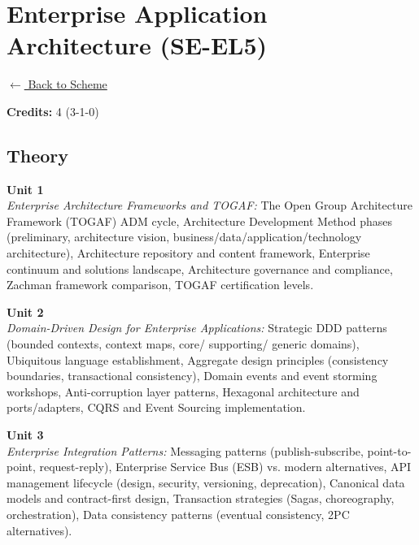 \section*{Enterprise Application Architecture (SE-EL5)}
\label{elec:SE_5}

\noindent \small{\hyperref[main:scheme]{$\leftarrow$ Back to Scheme}} \vspace{0.5cm}

\noindent \textbf{Credits:} 4 (3-1-0)

\subsection*{Theory}
\noindent\textbf{Unit 1} \\
\textit{Enterprise Architecture Frameworks and TOGAF:} The Open Group Architecture Framework (TOGAF) ADM cycle, Architecture Development Method phases (preliminary, architecture vision, business/data/application/technology architecture), Architecture repository and content framework, Enterprise continuum and solutions landscape, Architecture governance and compliance, Zachman framework comparison, TOGAF certification levels.

\vspace{0.3cm}

\noindent\textbf{Unit 2} \\
\textit{Domain-Driven Design for Enterprise Applications:} Strategic DDD patterns (bounded contexts, context maps, core/ supporting/ generic domains), Ubiquitous language establishment, Aggregate design principles (consistency boundaries, transactional consistency), Domain events and event storming workshops, Anti-corruption layer patterns, Hexagonal architecture and ports/adapters, CQRS and Event Sourcing implementation.

\vspace{0.3cm}

\noindent\textbf{Unit 3} \\
\textit{Enterprise Integration Patterns:} Messaging patterns (publish-subscribe, point-to-point, request-reply), Enterprise Service Bus (ESB) vs. modern alternatives, API management lifecycle (design, security, versioning, deprecation), Canonical data models and contract-first design, Transaction strategies (Sagas, choreography, orchestration), Data consistency patterns (eventual consistency, 2PC alternatives).

\vspace{0.3cm}

